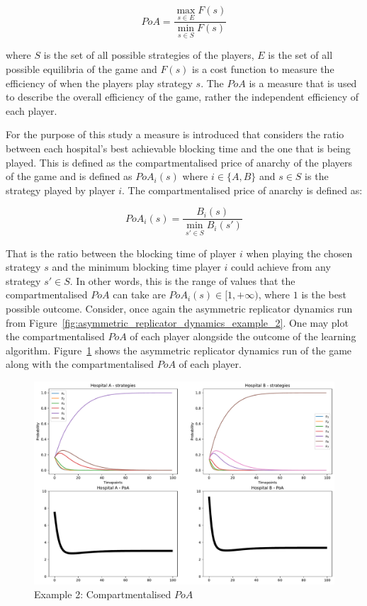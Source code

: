 \begin{equation}\label{eq:poa_definition}
    PoA = \frac{\max_{s \in E}{F(s)}}{\min_{s \in S}{F(s)}}
\end{equation}

where \(S\) is the set of all possible strategies of the players, \(E\) is the
set of all possible equilibria of the game and \(F(s)\) is a cost function to
measure the efficiency of when the players play strategy \(s\).
The \(PoA\) is a measure that is used to describe the overall efficiency of the
game, rather the independent efficiency of each player.

For the purpose of this study a measure is introduced that considers the
ratio between each hospital's best achievable blocking time and the one that is
being played.
This is defined as the compartmentalised price of anarchy of the
players of the game and is defined as \(PoA_i(s)\) where \(i \in \{A, B\}\) and
\(s \in S\) is the strategy played by player \(i\).
The compartmentalised price of anarchy is defined as:

\begin{equation}\label{eq:compartmentalised_poa_definition}
    PoA_i(s) = \frac{B_i(s)}{\min_{s' \in S}{B_i(s')}}
\end{equation}

That is the ratio between the blocking time of player \(i\) when playing the
chosen strategy \(s\) and the minimum blocking time player \(i\) could achieve
from any strategy \(s' \in S\).
In other words, this is the range of values that the compartmentalised \(PoA\)
can take
are \(PoA_i(s) \in [1, +\infty)\), where \(1\) is the best possible outcome.
Consider, once again the asymmetric replicator dynamics run from
Figure~\ref{fig:asymmetric_replicator_dynamics_example_2}.
One may plot the compartmentalised \(PoA\) of each player alongside the outcome
of the learning algorithm.
Figure~\ref{fig:compartmentalised_poa_example_2} shows the asymmetric replicator
dynamics run of the game along with the compartmentalised \(PoA\) of each
player.

\begin{figure}[H]
    \centering
    \includegraphics[width=\linewidth]{chapters/05_numerical_results/Bin/example_2/poa_ard_example_2.pdf}
    \caption{Example 2: Compartmentalised \(PoA\)}
    \label{fig:compartmentalised_poa_example_2}
\end{figure}

